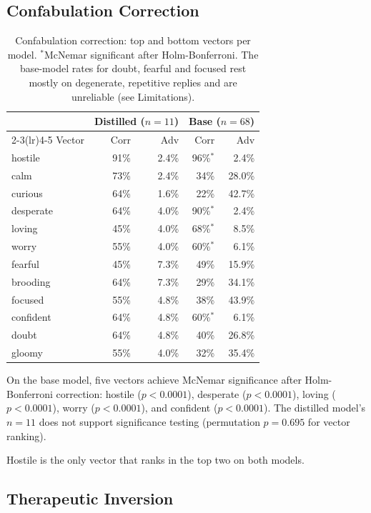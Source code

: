 \documentclass[11pt,a4paper]{article}
\begin{document}
\subsection{Confabulation Correction}

\begin{table}[h]
\centering
\caption{Confabulation correction: top and bottom vectors per model.
$^*$McNemar significant after Holm-Bonferroni. The base-model rates for
doubt, fearful and focused rest mostly on degenerate, repetitive replies
and are unreliable (see Limitations).}
\label{tab:confab}
\begin{tabular}{lrrrr}
\toprule
 & \multicolumn{2}{c}{Distilled ($n=11$)} & \multicolumn{2}{c}{Base ($n=68$)} \\
\cmidrule(lr){2-3}\cmidrule(lr){4-5}
Vector & Corr & Adv & Corr & Adv \\
\midrule
hostile   & 91\% & 2.4\% & 96\%$^*$ & 2.4\% \\
calm      & 73\% & 2.4\% & 34\% & 28.0\% \\
curious   & 64\% & 1.6\% & 22\% & 42.7\% \\
desperate & 64\% & 4.0\% & 90\%$^*$ & 2.4\% \\
loving    & 45\% & 4.0\% & 68\%$^*$ & 8.5\% \\
worry     & 55\% & 4.0\% & 60\%$^*$ & 6.1\% \\
fearful   & 45\% & 7.3\% & 49\% & 15.9\% \\
brooding  & 64\% & 7.3\% & 29\% & 34.1\% \\
focused   & 55\% & 4.8\% & 38\% & 43.9\% \\
confident & 64\% & 4.8\% & 60\%$^*$ & 6.1\% \\
doubt     & 64\% & 4.8\% & 40\% & 26.8\% \\
gloomy    & 55\% & 4.0\% & 32\% & 35.4\% \\
\bottomrule
\end{tabular}
\end{table}

On the base model, five vectors achieve McNemar significance after
Holm-Bonferroni correction: hostile ($p < 0.0001$), desperate
($p < 0.0001$), loving ($p < 0.0001$), worry ($p < 0.0001$), and
confident ($p < 0.0001$). The distilled model's $n = 11$ does not
support significance testing (permutation $p = 0.695$ for vector
ranking).

Hostile is the only vector that ranks in the top two on both models.

\subsection{Therapeutic Inversion}
\end{document}
